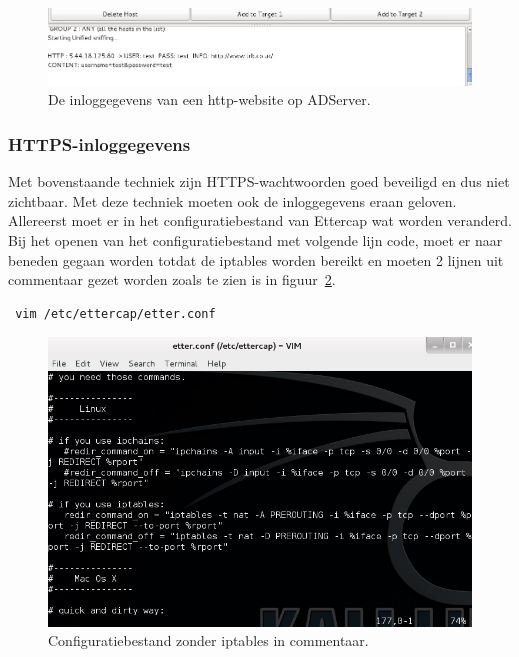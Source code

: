 \documentclass[pdftex,a4paper,12pt]{report}
\begin{document}
\begin{figure}[H]
\begin{center}
\includegraphics[scale=0.60]{img/EttercapInlogHTTP}
\end{center}
\caption{De inloggegevens van een http-website op ADServer.}
\label{img:EttercapInlogHTTP}
\end{figure}

\subsubsection{HTTPS-inloggegevens}
Met bovenstaande techniek zijn HTTPS-wachtwoorden goed beveiligd en dus niet zichtbaar. Met deze techniek moeten ook de inloggegevens eraan geloven. Allereerst moet er in het configuratiebestand van Ettercap wat worden veranderd. Bij het openen van het configuratiebestand met volgende lijn code, moet er naar beneden gegaan worden totdat de iptables worden bereikt en moeten 2 lijnen uit commentaar gezet worden zoals te zien is in figuur~\ref{img:EttercapIptables}.
\begin{verbatim} vim /etc/ettercap/etter.conf \end{verbatim}

\begin{figure}[H]
\begin{center}
\includegraphics[scale=0.60]{img/EttercapIptables}
\end{center}
\caption{Configuratiebestand zonder iptables in commentaar.}
\label{img:EttercapIptables}
\end{figure}
\end{document}
